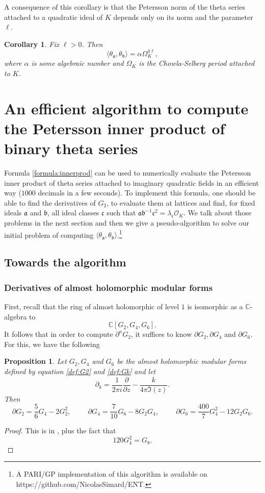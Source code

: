 \documentclass[twoside,10pt]{article}
\newtheorem{prop}{Proposition}
\newtheorem{coro}{Corollary}
\newcommand{\C}{\mathbb{C}}
\newcommand{\ida}{\mathfrak{a}}
\newcommand{\idb}{\mathfrak{b}}
\newcommand{\idc}{\mathfrak{c}}
\newcommand{\del}{\partial}
\renewcommand{\O}{\mathcal{O}}
\newcommand{\tida}{\theta_\mathfrak{a}}
\begin{document}
A consequence of this corollary is that the Petersson norm of the theta series attached to a quadratic ideal of $K$ depends only on its norm and the parameter $\ell$.

\begin{coro}\label{coro:algebraicitypip}
	Fix $\ell>0$. Then
	\[\langle\tida,\theta_\idb\rangle=\alpha\Omega_K^{4\ell},\]
	where $\alpha$ is some algebraic number and $\Omega_K$ is the Chowla-Selberg period attached to $K$.
\end{coro}

\section{An efficient algorithm to compute the Petersson inner product of binary theta series}\label{sec:algorithm}
Formula \ref{formula:innerprod} can be used to numerically evaluate the Petersson inner product of theta series attached to imaginary quadratic fields in an efficient way ($1000$ decimals in a few seconds). To implement this formula, one should be able to find the derivatives of $G_2$, to evaluate them at lattices and find, for fixed ideals $\ida$ and $\idb$, all ideal classes $\idc$ such that $\ida\idb^{-1}\idc^2=\lambda_\idc\O_K$. We talk about those problems in the next section and then we give a pseudo-algorithm to solve our initial problem of computing $\langle\tida,\theta_\idb\rangle$.\footnote{A PARI/GP implementation of this algorithm is available on {https://github.com/NicolasSimard/ENT}.}

\subsection{Towards the algorithm}
\subsubsection{Derivatives of almost holomorphic modular forms}
First, recall that the ring of almost holomorphic of level $1$ is isomorphic as a $\C$-algebra to
\[\C[G_2,G_4,G_6].\]
It follows that in order to compute $\del^nG_2$, it suffices to know $\del G_2,\del G_4$ and $\del G_6$. For this, we have the following

\begin{prop}
	Let $G_2,G_4$ and $G_6$ be the almost holomorphic modular forms defined by equation \ref{def:G2} and \ref{def:Gk} and let
	\[\del_k=\frac{1}{2\pi i}\frac{\del}{\del z}-\frac{k}{4\pi\Im(z)}.\]
	Then
	\[\del G_2=\frac{5}{6}G_4-2G_2^2,\hspace{1cm}\del G_4=\frac{7}{10}G_6-8G_2G_4,\hspace{1cm}\del G_6=\frac{400}{7}G_4^2-12G_2G_6.\]
\end{prop}
\begin{proof}
	This is in \cite[Sec 9.2]{Shi1}, plus the fact that
	\[120G_4^2=G_8.\]
\end{proof}
\end{document}
